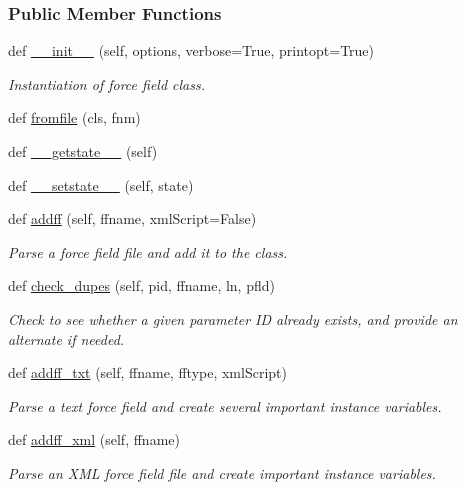 \subsubsection*{Public Member Functions}
\begin{DoxyCompactItemize}
\item 
def \hyperlink{classsrc_1_1ffyapf_1_1FF_a7a0ef2ed603c05f3566c07eb1ec26708}{\+\_\+\+\_\+init\+\_\+\+\_\+} (self, options, verbose=True, printopt=True)
\begin{DoxyCompactList}\small\item\em Instantiation of force field class. \end{DoxyCompactList}\item 
def \hyperlink{classsrc_1_1ffyapf_1_1FF_a3e573d0affb542431a364190cf2136b0}{fromfile} (cls, fnm)
\item 
def \hyperlink{classsrc_1_1ffyapf_1_1FF_a60075ec7331e05aca1e04683fde42abc}{\+\_\+\+\_\+getstate\+\_\+\+\_\+} (self)
\item 
def \hyperlink{classsrc_1_1ffyapf_1_1FF_a69027ebe91edbaa531ed1df2e0d91f1b}{\+\_\+\+\_\+setstate\+\_\+\+\_\+} (self, state)
\item 
def \hyperlink{classsrc_1_1ffyapf_1_1FF_afffd561460e3fbf6216709f63efa103f}{addff} (self, ffname, xml\+Script=False)
\begin{DoxyCompactList}\small\item\em Parse a force field file and add it to the class. \end{DoxyCompactList}\item 
def \hyperlink{classsrc_1_1ffyapf_1_1FF_ab59231fa39e29bfdc70466871c4ec8be}{check\+\_\+dupes} (self, pid, ffname, ln, pfld)
\begin{DoxyCompactList}\small\item\em Check to see whether a given parameter ID already exists, and provide an alternate if needed. \end{DoxyCompactList}\item 
def \hyperlink{classsrc_1_1ffyapf_1_1FF_ac25a6ff72cab072dadff7b9538e5d5b2}{addff\+\_\+txt} (self, ffname, fftype, xml\+Script)
\begin{DoxyCompactList}\small\item\em Parse a text force field and create several important instance variables. \end{DoxyCompactList}\item 
def \hyperlink{classsrc_1_1ffyapf_1_1FF_af943ddc128da40ca3007e78ac2cadfd9}{addff\+\_\+xml} (self, ffname)
\begin{DoxyCompactList}\small\item\em Parse an X\+ML force field file and create important instance variables. \end{DoxyCompactList}\item 

\end{DoxyCompactItemize}
